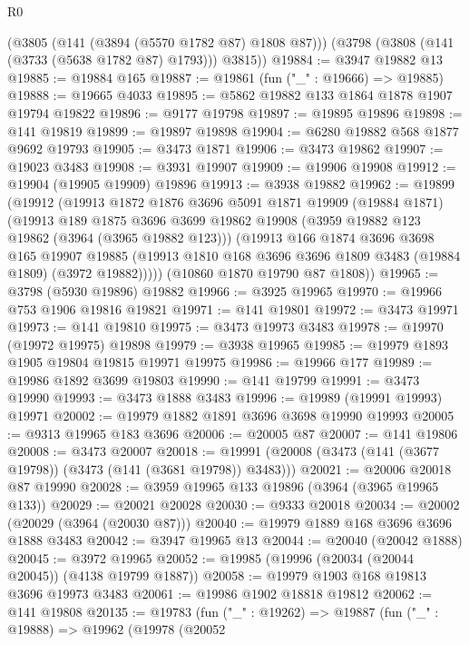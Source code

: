 \begin{lexlean}{R0}
\begin{coremodule}
      (@3805 (@141 (@3894 (@5570 @1782 @87) @1808 @87)))
      (@3798 (@3808 (@141 (@3733 (@5638 @1782 @87) @1793))) @3815))
@19884 := @3947 @19882 @13
@19885 := @19884 @165
@19887 := @19861 (fun ("_" : @19666) => @19885)
@19888 := @19665 @4033
@19895 := @5862 @19882 @133 @1864 @1878 @1907 @19794 @19822
@19896 := @9177 @19798
@19897 := @19895 @19896
@19898 := @141 @19819
@19899 := @19897 @19898
@19904 := @6280 @19882 @568 @1877 @9692 @19793
@19905 := @3473 @1871
@19906 := @3473 @19862
@19907 := @19023 @3483
@19908 := @3931 @19907
@19909 := @19906 @19908
@19912 := @19904 (@19905 @19909) @19896
@19913 := @3938 @19882
@19962 := @19899
    (@19912
      (@19913
        @1872
        @1876
        @3696
        @5091
        @1871
        @19909
        (@19884 @1871)
        (@19913
          @189
          @1875
          @3696
          @3699
          @19862
          @19908
          (@3959 @19882 @123 @19862 (@3964 (@3965 @19882 @123)))
          (@19913
            @166
            @1874
            @3696
            @3698
            @165
            @19907
            @19885
            (@19913 @1810 @168 @3696 @3696 @1809 @3483 (@19884 @1809) (@3972 @19882)))))
      (@10860 @1870 @19790 @87 @1808))
@19965 := @3798 (@5930 @19896) @19882
@19966 := @3925 @19965
@19970 := @19966 @753 @1906 @19816 @19821
@19971 := @141 @19801
@19972 := @3473 @19971
@19973 := @141 @19810
@19975 := @3473 @19973 @3483
@19978 := @19970 (@19972 @19975) @19898
@19979 := @3938 @19965
@19985 := @19979 @1893 @1905 @19804 @19815 @19971 @19975
@19986 := @19966 @177
@19989 := @19986 @1892 @3699 @19803
@19990 := @141 @19799
@19991 := @3473 @19990
@19993 := @3473 @1888 @3483
@19996 := @19989 (@19991 @19993) @19971
@20002 := @19979 @1882 @1891 @3696 @3698 @19990 @19993
@20005 := @9313 @19965 @183 @3696
@20006 := @20005 @87
@20007 := @141 @19806
@20008 := @3473 @20007
@20018 := @19991 (@20008 (@3473 (@141 (@3677 @19798)) (@3473 (@141 (@3681 @19798)) @3483)))
@20021 := @20006 @20018 @87 @19990
@20028 := @3959 @19965 @133 @19896 (@3964 (@3965 @19965 @133))
@20029 := @20021 @20028
@20030 := @9333 @20018
@20034 := @20002 (@20029 (@3964 (@20030 @87)))
@20040 := @19979 @1889 @168 @3696 @3696 @1888 @3483
@20042 := @3947 @19965 @13
@20044 := @20040 (@20042 @1888)
@20045 := @3972 @19965
@20052 := @19985 (@19996 (@20034 (@20044 @20045)) (@4138 @19799 @1887))
@20058 := @19979 @1903 @168 @19813 @3696 @19973 @3483
@20061 := @19986 @1902 @18818 @19812
@20062 := @141 @19808
@20135 := @19783
    (fun ("_" : @19262) =>
    @19887
      (fun ("_" : @19888) =>
      @19962
        (@19978
          (@20052

\end{coremodule}
\end{lexlean}
